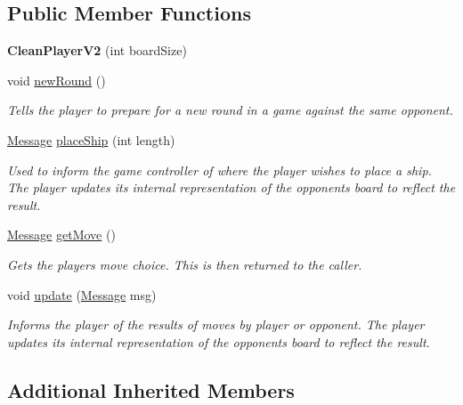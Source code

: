 \subsection*{Public Member Functions}
\begin{DoxyCompactItemize}
\item 
{\bfseries Clean\+Player\+V2} (int board\+Size)\hypertarget{classCleanPlayerV2_abe900962579c2dacad150eeb72b63a1d}{}\label{classCleanPlayerV2_abe900962579c2dacad150eeb72b63a1d}

\item 
void \hyperlink{classCleanPlayerV2_ae672fa4e3b50874b55fa85231c9cfd16}{new\+Round} ()
\begin{DoxyCompactList}\small\item\em Tells the player to prepare for a new round in a game against the same opponent. \end{DoxyCompactList}\item 
\hyperlink{classMessage}{Message} \hyperlink{classCleanPlayerV2_ac18f0c9b222f62132ae8be605ff67022}{place\+Ship} (int length)
\begin{DoxyCompactList}\small\item\em Used to inform the game controller of where the player wishes to place a ship. The player updates its internal representation of the opponent\textquotesingle{}s board to reflect the result. \end{DoxyCompactList}\item 
\hyperlink{classMessage}{Message} \hyperlink{classCleanPlayerV2_a36a45ec4f24abcc4e19a6895d4895eeb}{get\+Move} ()
\begin{DoxyCompactList}\small\item\em Gets the player\textquotesingle{}s move choice. This is then returned to the caller. \end{DoxyCompactList}\item 
void \hyperlink{classCleanPlayerV2_ae3c61b1d882a6edb22446cb64e00560f}{update} (\hyperlink{classMessage}{Message} msg)
\begin{DoxyCompactList}\small\item\em Informs the player of the results of move\textquotesingle{}s by player or opponent. The player updates its internal representation of the opponent\textquotesingle{}s board to reflect the result. \end{DoxyCompactList}\end{DoxyCompactItemize}
\subsection*{Additional Inherited Members}


